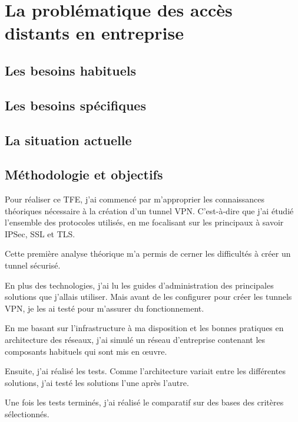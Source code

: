 \part{La problématique des accès distants en entreprise}
\chapter{Les besoins habituels}
\chapter{Les besoins spécifiques}
\chapter{La situation actuelle}
\chapter{Méthodologie et objectifs}
Pour réaliser ce TFE, j'ai commencé par m'approprier les connaissances théoriques nécessaire à la création d'un tunnel VPN.
C'est-à-dire que j'ai étudié l'ensemble des protocoles utilisés, en me focalisant sur les principaux à savoir IPSec, SSL et TLS.

Cette première analyse théorique m'a permis de cerner les difficultés à créer un tunnel sécurisé.

En plus des technologies, j'ai lu les guides d'administration des principales solutions que j'allais utiliser.
Mais avant de les configurer pour créer les tunnels VPN, je les ai testé pour m'assurer du fonctionnement.

En me basant sur l'infrastructure à ma disposition et les bonnes pratiques en architecture des réseaux, j'ai simulé un réseau d'entreprise contenant les composants habituels qui sont mis en œuvre.

Ensuite, j'ai réalisé les tests.
Comme l'architecture variait entre les différentes solutions, j'ai testé les solutions l'une après l'autre. 

Une fois les tests terminés, j'ai réalisé le comparatif sur des bases des critères sélectionnés. 
